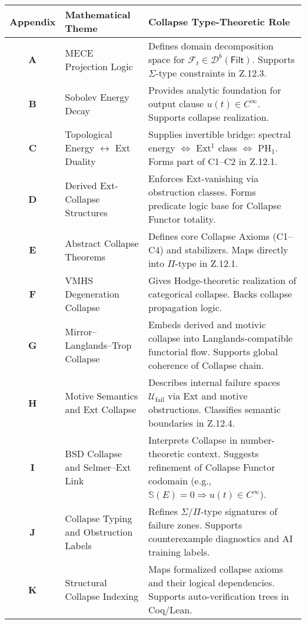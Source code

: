 \documentclass[11pt]{article}
\newcommand{\Sha}{\mathbb{S}}
\begin{document}
\begin{axiom}
\begin{axiom}
{{\begin{longtable}{|c|p{5.2cm}|p{7.5cm}|}
\hline
\textbf{Appendix} & \textbf{Mathematical Theme} & \textbf{Collapse Type-Theoretic Role} \\
\hline
\textbf{A} & MECE Projection Logic & Defines domain decomposition space for \( \mathcal{F}_t \in \mathcal{D}^b(\mathsf{Filt}) \). Supports \(\Sigma\)-type constraints in Z.12.3. \\
\hline
\textbf{B} & Sobolev Energy Decay & Provides analytic foundation for output clause \( u(t) \in C^\infty \). Supports collapse realization. \\
\hline
\textbf{C} & Topological Energy \(\leftrightarrow\) Ext Duality & Supplies invertible bridge: spectral energy \(\Leftrightarrow\) Ext$^1$ class \(\Leftrightarrow\) PH$_1$. Forms part of C1–C2 in Z.12.1. \\
\hline
\textbf{D} & Derived Ext-Collapse Structures & Enforces Ext-vanishing via obstruction classes. Forms predicate logic base for Collapse Functor totality. \\
\hline
\textbf{E} & Abstract Collapse Theorems & Defines core Collapse Axioms (C1–C4) and stabilizers. Maps directly into \(\Pi\)-type in Z.12.1. \\
\hline
\textbf{F} & VMHS Degeneration Collapse & Gives Hodge-theoretic realization of categorical collapse. Backs collapse propagation logic. \\
\hline
\textbf{G} & Mirror–Langlands–Trop Collapse & Embeds derived and motivic collapse into Langlands-compatible functorial flow. Supports global coherence of Collapse chain. \\
\hline
\textbf{H} & Motive Semantics and Ext Collapse & Describes internal failure spaces \( \mathcal{U}_{\text{fail}} \) via Ext and motive obstructions. Classifies semantic boundaries in Z.12.4. \\
\hline
\textbf{I} & BSD Collapse and Selmer–Ext Link & Interprets Collapse in number-theoretic context. Suggests refinement of Collapse Functor codomain (e.g., \( \Sha(E) = 0 \Rightarrow u(t) \in C^\infty \)). \\
\hline
\textbf{J} & Collapse Typing and Obstruction Labels & Refines \(\Sigma/\Pi\)-type signatures of failure zones. Supports counterexample diagnostics and AI training labels. \\
\hline
\textbf{K} & Structural Collapse Indexing & Maps formalized collapse axioms and their logical dependencies. Supports auto-verification trees in Coq/Lean. \\

\end{longtable}}}
\end{axiom}
\end{axiom}
\end{document}
